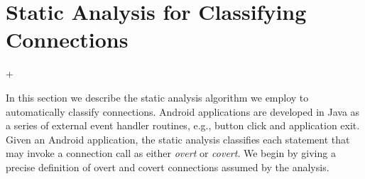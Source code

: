 \vspace{-0.05in}
\section{Static Analysis for Classifying Connections}
\label{sec:analysis}

\lstMakeShortInline[basicstyle=\scriptsize\ttfamily,keywordstyle=\color{DarkPurple},breaklines=false]+

In this section we describe the static analysis algorithm we employ to
automatically classify connections.  Android applications are
developed in Java as a series of external event handler routines,
e.g., button click and application exit.  Given an Android
application, the static analysis classifies each statement that may
invoke a connection call as either {\it overt} or {\it covert}.  We
begin by giving a precise definition of overt and covert connections
assumed by the analysis.



